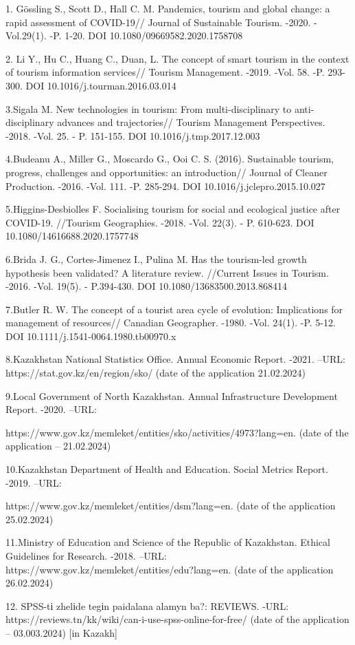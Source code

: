 \begin{noparindent}
1. Gössling S., Scott D., Hall C. M. Pandemics, tourism and global
change: a rapid assessment of COVID-19// Journal of Sustainable Tourism.
-2020. -Vol.29(1). -P. 1-20. DOI 10.1080/09669582.2020.1758708

2. Li Y., Hu C., Huang C., Duan, L. The concept of smart tourism in the
context of tourism information services// Tourism Management. -2019.
-Vol. 58. -P. 293-300. DOI 10.1016/j.tourman.2016.03.014

3.Sigala M. New technologies in tourism: From multi-disciplinary to
anti-disciplinary advances and trajectories// Tourism Management
Perspectives. -2018. -Vol. 25. - P. 151-155. DOI
10.1016/j.tmp.2017.12.003

4.Budeanu A., Miller G., Moscardo G., Ooi C. S. (2016). Sustainable
tourism, progress, challenges and opportunities: an introduction//
Journal of Cleaner Production. -2016. -Vol. 111. -P. 285-294. DOI
10.1016/j.jclepro.2015.10.027

5.Higgins-Desbiolles F. Socialising tourism for social and ecological
justice after COVID-19. //Tourism Geographies. -2018. -Vol. 22(3). - P.
610-623. DOI 10.1080/14616688.2020.1757748

6.Brida J. G., Cortes-Jimenez I., Pulina M. Has the tourism-led growth
hypothesis been validated? A literature review. //Current Issues in
Tourism. -2016. -Vol. 19(5). - P.394-430. DOI
10.1080/13683500.2013.868414

7.Butler R. W. The concept of a tourist area cycle of evolution:
Implications for management of resources// Canadian Geographer. -1980.
-Vol. 24(1). -P. 5-12. DOI 10.1111/j.1541-0064.1980.tb00970.x

8.Kazakhstan National Statistics Office. Annual Economic Report. -2021.
--URL: https://stat.gov.kz/en/region/sko/ (date of the application
21.02.2024)

9.Local Government of North Kazakhstan. Annual Infrastructure
Development Report. -2020. --URL:

https://www.gov.kz/memleket/entities/sko/activities/4973?lang=en. (date
of the application -- 21.02.2024)

10.Kazakhstan Department of Health and Education. Social Metrics Report.
-2019. --URL:

https://www.gov.kz/memleket/entities/dsm?lang=en. (date of
the application 25.02.2024)

11.Ministry of Education and Science of the Republic of Kazakhstan.
Ethical Guidelines for Research. -2018. --URL:
https://www.gov.kz/memleket/entities/edu?lang=en. (date of the
application 26.02.2024)

12. SPSS-tі zhelіde tegіn paidalana alamyn ba?: REVIEWS. -URL:
https://reviews.tn/kk/wiki/can-i-use-spss-online-for-free/ (date of the
application -- 03.003.2024) {[}in Kazakh{]}
\end{noparindent}

